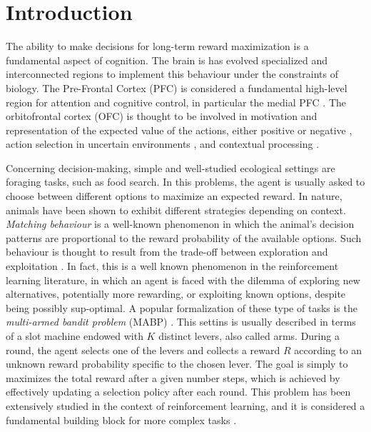 
\section{Introduction}
\hfill \break
\vspace {0.5cm}

The ability to make decisions for long-term reward maximization is a fundamental aspect of cognition. The brain is has evolved specialized and interconnected regions to implement this behaviour under the constraints of biology.
The Pre-Frontal Cortex (PFC) is considered a fundamental high-level region for attention and cognitive control, in particular the medial PFC \cite{millerIntegrativeTheoryPrefrontal2001a, sheynikhovichLongtermMemorySynaptic2023}.
The orbitofrontal cortex (OFC) is thought to be involved in motivation and representation of the expected value of the actions, either positive or negative \cite{odohertyAbstractRewardPunishment2001, ricebergRewardStabilityDetermines2012, tremblayRelativeRewardPreference1999}, action selection in uncertain environments \cite{elliottDissociableFunctionsMedial2000}, and contextual processing \cite{frankAnatomyDecisionStriatoorbitofrontal2006}.

Concerning decision-making, simple and well-studied ecological settings are foraging tasks, such as food search. In this problems, the agent is usually asked to choose between different options to maximize an expected reward.
In nature, animals have been shown to exhibit different strategies depending on context.
\textit{Matching behaviour} is a well-known phenomenon in which the animal's decision patterns are proportional to the reward probability of the available options.
Such behaviour is thought to result from the trade-off between exploration and exploitation \cite{suttonReinforcementLearningProblem1998, nivEvolutionReinforcementLearning2002}.
In fact, this is a well known phenomenon in the reinforcement learning literature, in which an agent is faced with the dilemma of exploring new alternatives, potentially more rewarding, or exploiting known options, despite being possibly sup-optimal.
A popular formalization of these type of tasks is the \textit{multi-armed bandit problem} (MABP) \cite{averbeckTheoryChoiceBandit2015}. This settins is usually described in terms of a slot machine endowed with $K$ distinct levers, also called arms.
During a round, the agent selects one of the levers and collects a reward $R$ according to an unknown reward probability specific to the chosen lever.
The goal is simply to maximizes the total reward after a given number steps, which is achieved by effectively updating a selection policy after each round.
This problem has been extensively studied in the context of reinforcement learning, and it is considered a fundamental building block for more complex tasks \cite{suttonReinforcementLearningProblem1998}.

